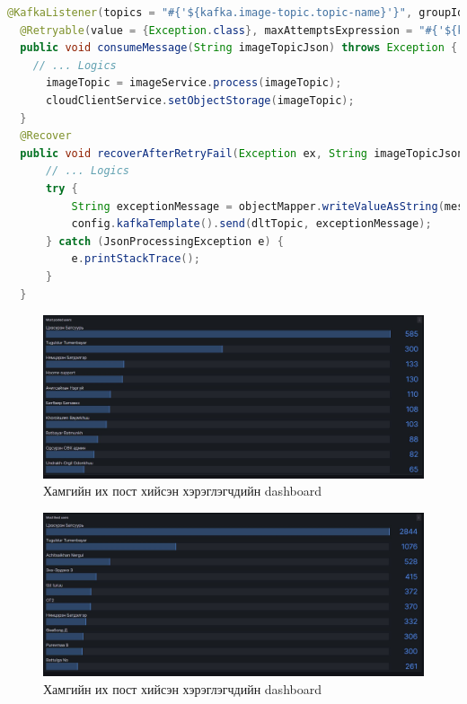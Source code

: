\begin{lstlisting}[language=Java, caption=Retryable-ийг хэрэгжүүлсэн байдал, frame=single]
@KafkaListener(topics = "#{'${kafka.image-topic.topic-name}'}", groupId = "#{'${kafka.image-topic.topic-group-id}'}")
  @Retryable(value = {Exception.class}, maxAttemptsExpression = "#{'${kafka.image-topic.consumer.attempts}'}", backoff = @Backoff(delayExpression = "#{'${kafka.image-topic.consumer.backoff.delay}'}", multiplierExpression = "#{'${kafka.image-topic.consumer.backoff.multiplier}'}"))
  public void consumeMessage(String imageTopicJson) throws Exception {
    // ... Logics
      imageTopic = imageService.process(imageTopic);
      cloudClientService.setObjectStorage(imageTopic);
  }
  @Recover
  public void recoverAfterRetryFail(Exception ex, String imageTopicJson) {
      // ... Logics
      try {
          String exceptionMessage = objectMapper.writeValueAsString(messageMap);
          config.kafkaTemplate().send(dltTopic, exceptionMessage);
      } catch (JsonProcessingException e) {
          e.printStackTrace();
      }
  }
\end{lstlisting}

\begin{figure}[h]
    \centering
    \includegraphics[scale=0.3]{imgs/mostPosted.JPG}
    \caption{Хамгийн их пост хийсэн хэрэглэгчдийн dashboard}
\end{figure}

\begin{figure}[h]
    \centering
    \includegraphics[scale=0.3]{imgs/mostLiked.JPG}
    \caption{Хамгийн их пост хийсэн хэрэглэгчдийн dashboard}
\end{figure}